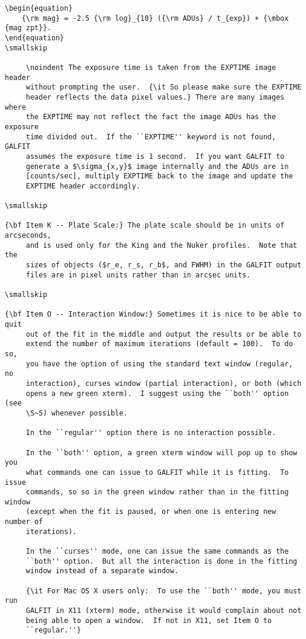 \documentclass[preprint]{aastex}
\begin{document}
\begin {verbatim}
\begin{equation}
	{\rm mag} = -2.5 {\rm log}_{10} ({\rm ADUs} / t_{exp}) + {\mbox {mag zpt}}.
\end{equation}
\smallskip

	 \noindent The exposure time is taken from the EXPTIME image header
	 without prompting the user.  {\it So please make sure the EXPTIME
	 header reflects the data pixel values.} There are many images where
	 the EXPTIME may not reflect the fact the image ADUs has the exposure
	 time divided out.  If the ``EXPTIME'' keyword is not found, GALFIT
	 assumes the exposure time is 1 second.  If you want GALFIT to
	 generate a $\sigma_{x,y}$ image internally and the ADUs are in
	 [counts/sec], multiply EXPTIME back to the image and update the
	 EXPTIME header accordingly.

\smallskip

{\bf Item K -- Plate Scale:} The plate scale should be in units of arcseconds,
	 and is used only for the King and the Nuker profiles.  Note that the
	 sizes of objects ($r_e, r_s, r_b$, and FWHM) in the GALFIT output
	 files are in pixel units rather than in arcsec units.

\smallskip

{\bf Item O -- Interaction Window:} Sometimes it is nice to be able to quit
	 out of the fit in the middle and output the results or be able to
	 extend the number of maximum iterations (default = 100).  To do so,
	 you have the option of using the standard text window (regular, no
	 interaction), curses window (partial interaction), or both (which
	 opens a new green xterm).  I suggest using the ``both'' option (see
	 \S~5) whenever possible.

	 In the ``regular'' option there is no interaction possible.

	 In the ``both'' option, a green xterm window will pop up to show you
	 what commands one can issue to GALFIT while it is fitting.  To issue
	 commands, so so in the green window rather than in the fitting window
	 (except when the fit is paused, or when one is entering new number of
	 iterations).

	 In the ``curses'' mode, one can issue the same commands as the
	 ``both'' option.  But all the interaction is done in the fitting
	 window instead of a separate window.

	 {\it For Mac OS X users only:  To use the ``both'' mode, you must run
	 GALFIT in X11 (xterm) mode, otherwise it would complain about not
	 being able to open a window.  If not in X11, set Item O to
	 ``regular.''}


\end{verbatim}
\end{document}
